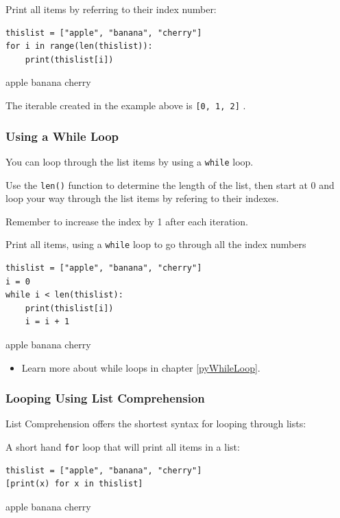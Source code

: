 \documentclass[12pt,a4paper]{article}
\newcommand{\code}[1]{%
	\colorbox{backcolour}{\lstinline{#1}}%
}
\newcommand{\lcode}[1]{%
	\lstinline{#1}%
}
\begin{document}
\begin{ebox}
Print all items by referring to their index number:
	\begin{lstlisting}
thislist = ["apple", "banana", "cherry"]
for i in range(len(thislist)):
    print(thislist[i])
	\end{lstlisting}
\tcblower
	\begin{vercode}
apple
banana
cherry
	\end{vercode}
\end{ebox}

The iterable created in the example above is \code{[0, 1, 2]}.
\subsubsection{Using a While Loop}

You can loop through the list items by using a \code{while} loop.

Use the \code{len()} function to determine the length of the list, then start at 0 and
loop your way through the list items by refering to their indexes.

Remember to increase the index by 1 after each iteration.

\begin{ebox}
Print all items, using a \lcode{while} loop to go through all the index numbers
	\begin{lstlisting}
thislist = ["apple", "banana", "cherry"]
i = 0
while i < len(thislist):
    print(thislist[i])
    i = i + 1
	\end{lstlisting}
\tcblower
	\begin{vercode}
apple
banana
cherry
	\end{vercode}
\end{ebox}

\begin{itemize}
	\item Learn more about while loops in chapter \ref{pyWhileLoop}.
\end{itemize}
\subsubsection{Looping Using List Comprehension}

List Comprehension offers the shortest syntax for looping through lists:

\begin{ebox}
A short hand \lcode{for} loop that will print all items in a list:
	\begin{lstlisting}
thislist = ["apple", "banana", "cherry"]
[print(x) for x in thislist]
	\end{lstlisting}
\tcblower
	\begin{vercode}
apple
banana
cherry
	\end{vercode}
\end{ebox}
\end{document}
